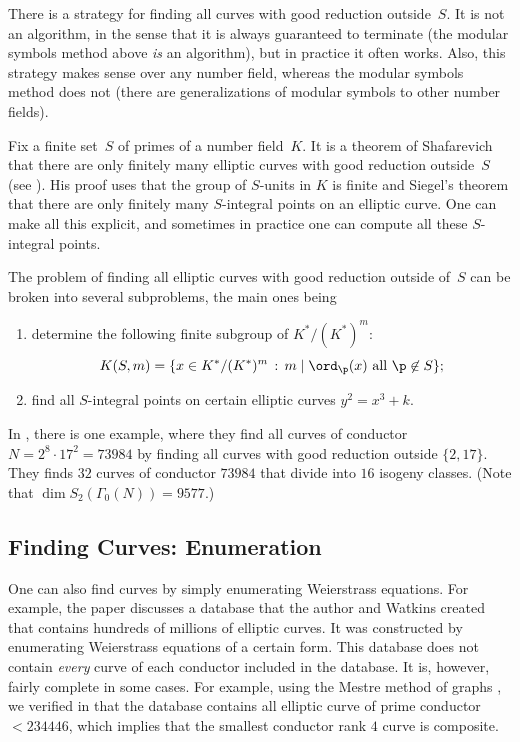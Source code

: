 There is a strategy for finding all curves with good reduction
outside~$S$.  It is not an algorithm, in the sense
that it is always guaranteed to terminate (the modular symbols method
above {\em is} an algorithm), but in practice it often works.  Also,
this strategy makes sense over any number field, whereas the modular
symbols method does not (there are generalizations of modular
symbols to other number fields).

Fix a finite set~$S$ of primes of a number field~$K$.  It is a theorem
of Shafarevich that there are only finitely many elliptic curves with
good reduction outside~$S$ (see \cite[Section~IX.6]{silverman:aec}).  His
proof uses that the group of $S$-units in $K$ is finite and Siegel's
theorem that there are only finitely many $S$-integral points on an
elliptic curve.  One can make all this explicit, and sometimes in
practice one can compute all these $S$-integral points.  

The problem of finding all elliptic curves with good reduction outside
of~$S$ can be broken into several subproblems, the main ones being
\begin{enumerate}
\item determine the following finite subgroup of $K^*/(K^*)^m$:
$$
  K(S,m) = \{x \in K^*/(K^*)^m \, : \, m \mid \ord_\p(x) \text{ all } \p\not\in S\};
$$
\item find all $S$-integral points on certain elliptic curves
$y^2=x^3 + k$.
\end{enumerate}

In \cite{cremona-lingham}, there is one example, where they find all
curves of conductor $N=2^8\cdot 17^2 = 73984$ by finding all curves
with good reduction outside $\{2, 17\}$.  They finds $32$ curves of
conductor $73984$ that divide into $16$ isogeny classes. 
(Note that $\dim S_2(\Gamma_0(N)) = 9577$.)

\subsection{Finding Curves: Enumeration}
One can also find curves by simply enumerating Weierstrass equations.
For example, the paper \cite{stein-watkins:ants5} discusses a database
that the author and Watkins created that contains hundreds of millions
of elliptic curves.  It was constructed by enumerating Weierstrass
equations of a certain form.  This database does not contain {\em
  every} curve of each conductor included in the database.  It is,
however, fairly complete in some cases.  For example, using the Mestre
method of graphs \cite{mestre:graphs}, we verified in \cite{rank4} that
the database contains all elliptic curve of prime conductor $< 234446$, which implies that the smallest conductor
rank $4$ curve is composite.
















